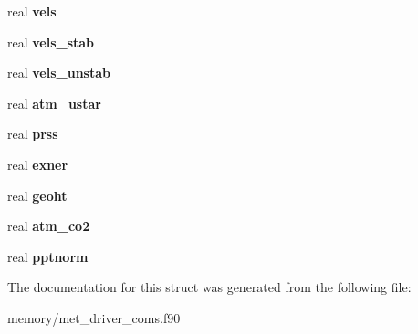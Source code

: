 \begin{DoxyCompactItemize}
\item 
\hypertarget{structmet__driver__coms_1_1met__driv__state_a2f1468290cf4c5191ff3305516f403b4}{
real {\bfseries vels}}
\label{structmet__driver__coms_1_1met__driv__state_a2f1468290cf4c5191ff3305516f403b4}

\item 
\hypertarget{structmet__driver__coms_1_1met__driv__state_aea2f12c370f025cc899515c9043dbdb9}{
real {\bfseries vels\_\-stab}}
\label{structmet__driver__coms_1_1met__driv__state_aea2f12c370f025cc899515c9043dbdb9}

\item 
\hypertarget{structmet__driver__coms_1_1met__driv__state_a5237ae89349cfee1060065ed728b8bb1}{
real {\bfseries vels\_\-unstab}}
\label{structmet__driver__coms_1_1met__driv__state_a5237ae89349cfee1060065ed728b8bb1}

\item 
\hypertarget{structmet__driver__coms_1_1met__driv__state_a2ae1bf578a610d259dc6312cfe52bd6c}{
real {\bfseries atm\_\-ustar}}
\label{structmet__driver__coms_1_1met__driv__state_a2ae1bf578a610d259dc6312cfe52bd6c}

\item 
\hypertarget{structmet__driver__coms_1_1met__driv__state_a06b520bcea3424567bf379011fe40e73}{
real {\bfseries prss}}
\label{structmet__driver__coms_1_1met__driv__state_a06b520bcea3424567bf379011fe40e73}

\item 
\hypertarget{structmet__driver__coms_1_1met__driv__state_ac473e9c3fd6e4d935a49ba24ef15d26b}{
real {\bfseries exner}}
\label{structmet__driver__coms_1_1met__driv__state_ac473e9c3fd6e4d935a49ba24ef15d26b}

\item 
\hypertarget{structmet__driver__coms_1_1met__driv__state_a511aa6dfb471f836dbe7e0e0e6124d3e}{
real {\bfseries geoht}}
\label{structmet__driver__coms_1_1met__driv__state_a511aa6dfb471f836dbe7e0e0e6124d3e}

\item 
\hypertarget{structmet__driver__coms_1_1met__driv__state_ab05d25010c91731e9503dbd6a618dd95}{
real {\bfseries atm\_\-co2}}
\label{structmet__driver__coms_1_1met__driv__state_ab05d25010c91731e9503dbd6a618dd95}

\item 
\hypertarget{structmet__driver__coms_1_1met__driv__state_a940ce4816665900d5de54bd07c5b87ec}{
real {\bfseries pptnorm}}
\label{structmet__driver__coms_1_1met__driv__state_a940ce4816665900d5de54bd07c5b87ec}

\end{DoxyCompactItemize}


The documentation for this struct was generated from the following file:\begin{DoxyCompactItemize}
\item 
memory/met\_\-driver\_\-coms.f90\end{DoxyCompactItemize}
